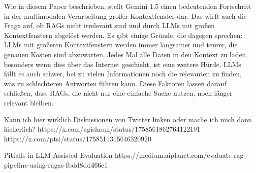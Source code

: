 Wie in diesem Paper \cite{gemini2024v15} beschrieben, stellt Gemini 1.5 einen bedeutenden Fortschritt in der multimodalen Verarbeitung großer Kontextfenster dar. Das wirft auch die Frage auf, ob RAGs nicht irrelevant sind und durch LLMs mit großen Kontextfenstern abgelöst werden.
Es gibt einige Gründe, die dagegen sprechen: LLMs mit größeren Kontextfenstern werden immer langsamer und teurer, die genauen Kosten sind abzuwarten. Jedes Mal alle Daten in den Kontext zu laden, besonders wenn dies über das Internet geschieht, ist eine weitere Hürde. LLMs fällt es auch schwer, bei zu vielen Informationen noch die relevanten zu finden, was zu schlechteren Antworten führen kann.
Diese Faktoren lassen darauf schließen, dass RAGs, die nicht nur eine einfache Suche nutzen, noch länger relevant bleiben.

Kann ich hier wirklich Diskussionen von Twitter linken oder mache ich mich dann lächerlich?
https://x.com/agishaun/status/1758561862764122191
https://x.com/ptsi/status/1758511315646320920


Pitfalls in LLM Assisted Evaluation https://medium.aiplanet.com/evaluate-rag-pipeline-using-ragas-fbdd8dd466c1
